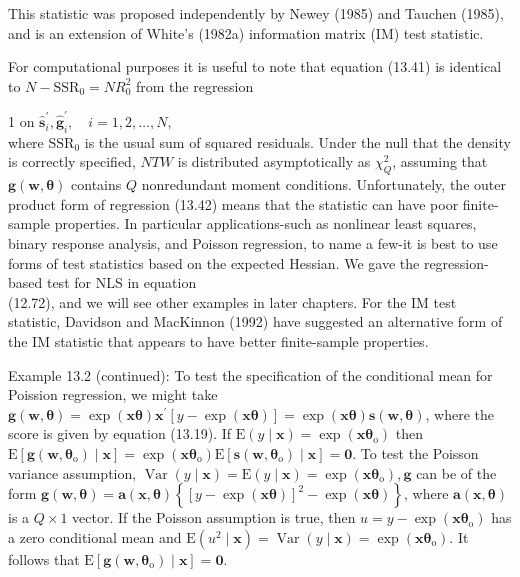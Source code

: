 \documentclass[10pt]{article}
\begin{document}
This statistic was proposed independently by Newey (1985) and Tauchen (1985), and is an extension of White's (1982a) information matrix (IM) test statistic.

For computational purposes it is useful to note that equation (13.41) is identical to $N-\mathrm{SSR}_{0}=N R_{0}^{2}$ from the regression

1 on $\hat{\mathbf{s}}_{i}^{\prime}, \hat{\mathbf{g}}_{i}^{\prime}, \quad i=1,2, \ldots, N$,\\
where $\mathrm{SSR}_{0}$ is the usual sum of squared residuals. Under the null that the density is correctly specified, $N T W$ is distributed asymptotically as $\chi_{Q}^{2}$, assuming that $\mathbf{g}(\mathbf{w}, \boldsymbol{\theta})$ contains $Q$ nonredundant moment conditions. Unfortunately, the outer product form of regression (13.42) means that the statistic can have poor finite-sample properties. In particular applications-such as nonlinear least squares, binary response analysis, and Poisson regression, to name a few-it is best to use forms of test statistics based on the expected Hessian. We gave the regression-based test for NLS in equation\\
(12.72), and we will see other examples in later chapters. For the IM test statistic, Davidson and MacKinnon (1992) have suggested an alternative form of the IM statistic that appears to have better finite-sample properties.

Example 13.2 (continued): To test the specification of the conditional mean for Poission regression, we might take $\mathbf{g}(\mathbf{w}, \boldsymbol{\theta})=\exp (\mathbf{x} \boldsymbol{\theta}) \mathbf{x}^{\prime}[y-\exp (\mathbf{x} \boldsymbol{\theta})]=\exp (\mathbf{x} \boldsymbol{\theta}) \mathbf{s}(\mathbf{w}, \boldsymbol{\theta})$, where the score is given by equation (13.19). If $\mathrm{E}(y \mid \mathbf{x})=\exp \left(\mathbf{x} \boldsymbol{\theta}_{\mathrm{o}}\right)$ then $\mathrm{E}\left[\mathbf{g}\left(\mathbf{w}, \boldsymbol{\theta}_{\mathrm{o}}\right) \mid \mathbf{x}\right] =\exp \left(\mathbf{x} \boldsymbol{\theta}_{\mathrm{o}}\right) \mathrm{E}\left[\mathbf{s}\left(\mathbf{w}, \boldsymbol{\theta}_{\mathrm{o}}\right) \mid \mathbf{x}\right]=\mathbf{0}$. To test the Poisson variance assumption, $\operatorname{Var}(y \mid \mathbf{x})= \mathrm{E}(y \mid \mathbf{x})=\exp \left(\mathbf{x} \boldsymbol{\theta}_{\mathrm{o}}\right), \mathbf{g}$ can be of the form $\mathbf{g}(\mathbf{w}, \boldsymbol{\theta})=\mathbf{a}(\mathbf{x}, \boldsymbol{\theta})\left\{[y-\exp (\mathbf{x} \boldsymbol{\theta})]^{2}-\exp (\mathbf{x} \boldsymbol{\theta})\right\}$, where $\mathbf{a}(\mathbf{x}, \boldsymbol{\theta})$ is a $Q \times 1$ vector. If the Poisson assumption is true, then $u=y- \exp \left(\mathbf{x} \boldsymbol{\theta}_{\mathrm{o}}\right)$ has a zero conditional mean and $\mathrm{E}\left(u^{2} \mid \mathbf{x}\right)=\operatorname{Var}(y \mid \mathbf{x})=\exp \left(\mathbf{x} \boldsymbol{\theta}_{\mathrm{o}}\right)$. It follows that $\mathrm{E}\left[\mathbf{g}\left(\mathbf{w}, \boldsymbol{\theta}_{\mathrm{o}}\right) \mid \mathbf{x}\right]=\mathbf{0}$.
\end{document}
